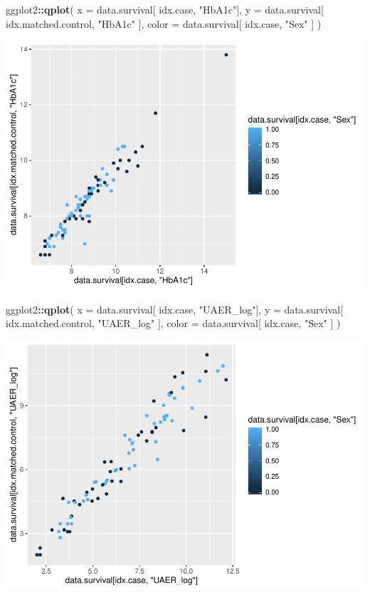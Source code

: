 \documentclass[]{article}
\newenvironment{Shaded}{\begin{snugshade}}{\end{snugshade}}
\newcommand{\DataTypeTok}[1]{\textcolor[rgb]{0.13,0.29,0.53}{#1}}
\newcommand{\KeywordTok}[1]{\textcolor[rgb]{0.13,0.29,0.53}{\textbf{#1}}}
\newcommand{\NormalTok}[1]{#1}
\newcommand{\OperatorTok}[1]{\textcolor[rgb]{0.81,0.36,0.00}{\textbf{#1}}}
\newcommand{\StringTok}[1]{\textcolor[rgb]{0.31,0.60,0.02}{#1}}
\begin{document}
\begin{Shaded}
\begin{Highlighting}[]
\NormalTok{ggplot2}\OperatorTok{::}\KeywordTok{qplot}\NormalTok{(}
  \DataTypeTok{x =}\NormalTok{ data.survival[ idx.case, }\StringTok{"HbA1c"}\NormalTok{], }
  \DataTypeTok{y =}\NormalTok{ data.survival[ idx.matched.control, }\StringTok{"HbA1c"}\NormalTok{ ], }
  \DataTypeTok{color =}\NormalTok{ data.survival[ idx.case, }\StringTok{"Sex"}\NormalTok{ ]}
\NormalTok{)}
\end{Highlighting}
\end{Shaded}

\includegraphics{0033_PROFIL--Metabolomics_files/figure-latex/RA-Matched-Subset-2.pdf}

\begin{Shaded}
\begin{Highlighting}[]
\NormalTok{ggplot2}\OperatorTok{::}\KeywordTok{qplot}\NormalTok{(}
  \DataTypeTok{x =}\NormalTok{ data.survival[ idx.case, }\StringTok{"UAER_log"}\NormalTok{], }
  \DataTypeTok{y =}\NormalTok{ data.survival[ idx.matched.control, }\StringTok{"UAER_log"}\NormalTok{ ], }
  \DataTypeTok{color =}\NormalTok{ data.survival[ idx.case, }\StringTok{"Sex"}\NormalTok{ ]}
\NormalTok{)}
\end{Highlighting}
\end{Shaded}

\includegraphics{0033_PROFIL--Metabolomics_files/figure-latex/RA-Matched-Subset-3.pdf}
\end{document}
